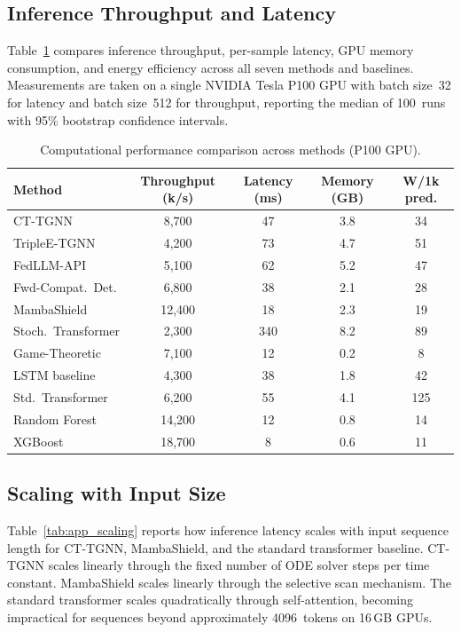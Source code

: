 \subsection{Inference Throughput and Latency}
\label{app:throughput}

Table~\ref{tab:app_throughput} compares inference throughput, per-sample latency, GPU memory consumption, and energy efficiency across all seven methods and baselines. Measurements are taken on a single NVIDIA Tesla P100 GPU with batch size~32 for latency and batch size~512 for throughput, reporting the median of 100~runs with 95\% bootstrap confidence intervals.

\begin{table}[htbp]
\centering
\caption{Computational performance comparison across methods (P100 GPU).}
\label{tab:app_throughput}
\begin{tabular}{lcccc}
\toprule
Method & Throughput (k/s) & Latency (ms) & Memory (GB) & W/1k pred. \\
\midrule
CT-TGNN            & 8{,}700 & 47 & 3.8 & 34 \\
TripleE-TGNN       & 4{,}200 & 73 & 4.7 & 51 \\
FedLLM-API         & 5{,}100 & 62 & 5.2 & 47 \\
Fwd-Compat.\ Det.            & 6{,}800 & 38 & 2.1 & 28 \\
MambaShield        & 12{,}400 & 18 & 2.3 & 19 \\
Stoch.\ Transformer & 2{,}300 & 340 & 8.2 & 89 \\
Game-Theoretic     & 7{,}100 & 12 & 0.2 & 8 \\
\midrule
LSTM baseline      & 4{,}300 & 38 & 1.8 & 42 \\
Std.\ Transformer  & 6{,}200 & 55 & 4.1 & 125 \\
Random Forest      & 14{,}200 & 12 & 0.8 & 14 \\
XGBoost            & 18{,}700 & 8 & 0.6 & 11 \\
\bottomrule
\end{tabular}
\end{table}


\subsection{Scaling with Input Size}
\label{app:scaling}

Table~\ref{tab:app_scaling} reports how inference latency scales with input sequence length for CT-TGNN, MambaShield, and the standard transformer baseline. CT-TGNN scales linearly through the fixed number of ODE solver steps per time constant. MambaShield scales linearly through the selective scan mechanism. The standard transformer scales quadratically through self-attention, becoming impractical for sequences beyond approximately 4096~tokens on 16\,GB GPUs.

